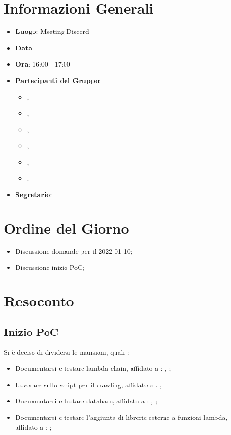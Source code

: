 \section{Informazioni Generali}

\begin{itemize}
\item{\textbf{Luogo}}: Meeting Discord
\item{\textbf{Data}}: \D{}
\item{\textbf{Ora}}: 16:00 - 17:00
\item{\textbf{Partecipanti del Gruppo}}: 
	\begin{itemize}
	\item{\FP{},}
	\item{\GC{},}
	\item{\LW{},}
	\item{\MB{},}
	\item{\MG{},}
	\item{\PV{}.}
	\end{itemize} 
\item{\textbf{Segretario}}: \PV{}	
\end{itemize}

\section{Ordine del Giorno}
\begin{itemize}
\item{Discussione domande per il 2022-01-10;}
\item{Discussione inizio PoC;}


\end{itemize}

\section{Resoconto}

\subsection{Inizio PoC}
Si è deciso di dividersi le mansioni, quali :  
\begin{itemize}
    \item Documentarsi e testare lambda chain, affidato a : \textit{\MG{}, \PV{}};
    \item Lavorare sullo script per il crawling, affidato a  : \textit{\FP{}};
    \item Documentarsi e testare database,  affidato a : \textit{\GC{}, \LW{}};
    \item Documentarsi e testare l'aggiunta di librerie esterne a funzioni lambda, affidato a : \textit{\MB{}};
\end{itemize}


